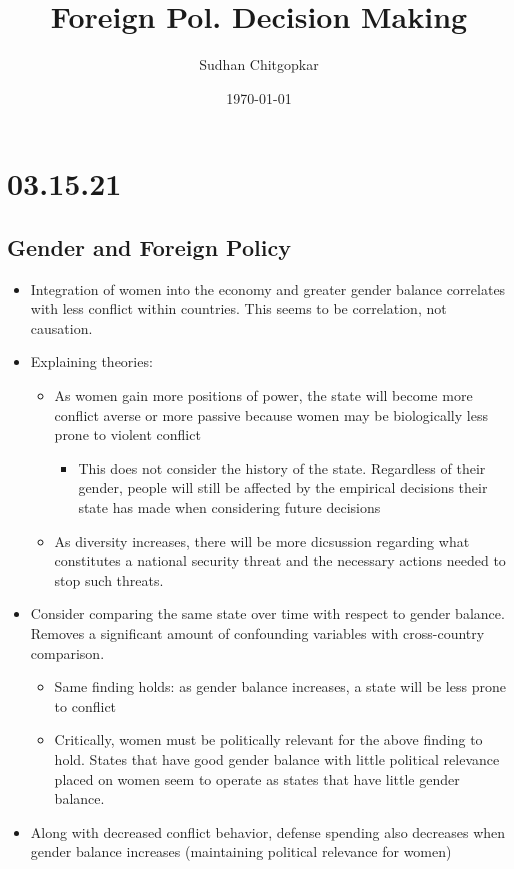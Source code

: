 \documentclass[11pt]{article}
\author{Sudhan Chitgopkar}
\date{\today}
\title{Foreign Pol. Decision Making}
\begin{document}
\maketitle
\section*{03.15.21}
\label{sec:orgf73bfa3}
\subsection*{Gender and Foreign Policy}
\label{sec:org456f81b}
\begin{itemize}
\item Integration of women into the economy and greater gender balance correlates with less conflict within countries. This seems to be correlation, not causation.
\item Explaining theories:
\begin{itemize}
\item As women gain more positions of power, the state will become more conflict averse or more passive because women may be biologically less prone to violent conflict
\begin{itemize}
\item This does not consider the history of the state. Regardless of their gender, people will still be affected by the empirical decisions their state has made when considering future decisions
\end{itemize}
\item As diversity increases, there will be more dicsussion regarding what constitutes a national security threat and the necessary actions needed to stop such threats.
\end{itemize}
\item Consider comparing the same state over time with respect to gender balance. Removes a significant amount of confounding variables with cross-country comparison.
\begin{itemize}
\item Same finding holds: as gender balance increases, a state will be less prone to conflict
\item Critically, women must be politically relevant for the above finding to hold. States that have good gender balance with little political relevance placed on women seem to operate as states that have little gender balance.
\end{itemize}
\item Along with decreased conflict behavior, defense spending also decreases when gender balance increases (maintaining political relevance for women)
\end{itemize}
\end{document}

